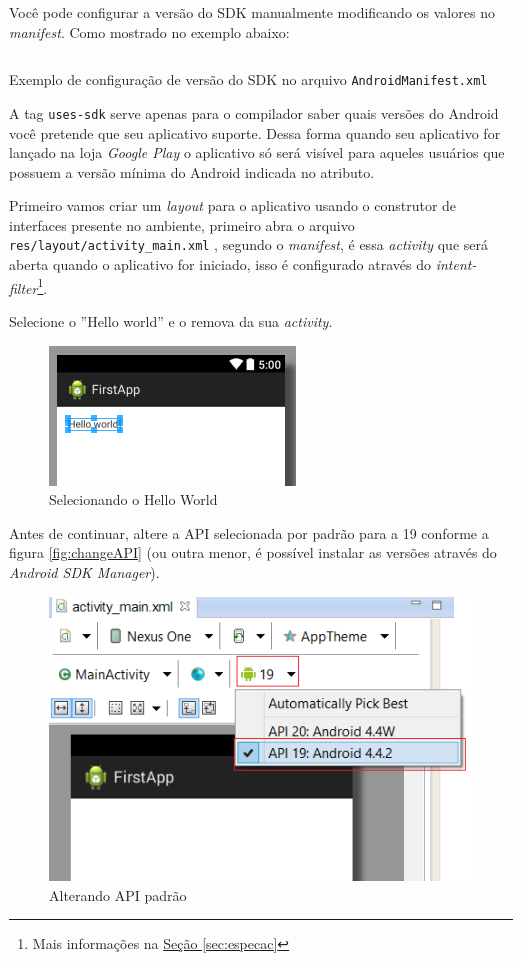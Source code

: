 \documentclass[a4paper,12pt,brazil,oneside]{book}
\begin{document}
Você pode configurar a versão do SDK manualmente modificando os valores no \emph{manifest}. Como mostrado no exemplo abaixo:


\begin{listing}[H]
\inputminted[linenos=true,fontsize=\small,frame=lines, framesep=2mm, tabsize=2,numbersep=5pt]{xml}{src/firstapp/sdk-manifest.xml}
\label{AndroidManifest.sdk}
\caption{Exemplo de configuração de versão do SDK no arquivo \texttt{AndroidManifest.xml} }
\end{listing}

A tag \texttt{uses-sdk} serve apenas para o compilador saber quais versões do Android você pretende que seu aplicativo suporte. Dessa forma quando seu aplicativo for lançado na loja \emph{Google Play} o aplicativo só será visível para aqueles usuários que possuem a versão mínima do Android indicada no atributo.

Primeiro vamos criar um \emph{layout} para o aplicativo usando o construtor de interfaces presente no ambiente, primeiro abra o arquivo \texttt{res/layout/activity\_main.xml} , segundo o \emph{manifest}, é essa \emph{activity} que será aberta quando o aplicativo for iniciado, isso é configurado através do \emph{intent-filter}\footnote{Mais informações na \hyperref[sec:especac]{Seção \ref*{sec:especac}}}. 

Selecione o ''Hello world'' e o remova da sua \emph{activity}.

\begin{figure}[H]
  \centering
  \includegraphics[width=.4\textwidth]{figuras/firstapp/firstapp6.png}
  \caption{Selecionando o Hello World}
  \label{fig:firstapp6}
\end{figure}

Antes de continuar, altere a API selecionada por padrão para a 19 conforme a figura \autoref{fig:changeAPI} (ou outra menor, é possível instalar as versões através do \emph{Android SDK Manager}).

\begin{figure}[H]
  \centering
  \includegraphics[width=.5\textwidth]{figuras/firstapp/changeAPI.png}
  \caption{Alterando API padrão}
  \label{fig:changeAPI}
\end{figure}
\end{document}
